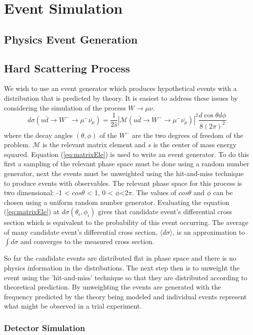 \chapter{Event Simulation}
\section{Physics Event Generation}
\section{Hard Scattering Process}
We wish to use an event generator which produces hypothetical events with a distribution
that is predicted by theory.
It is easiest to address these issues by considering the simulation of 
the process $W\rightarrow\mu\nu$. 
\begin{equation}
d\sigma(u\bar{d}\rightarrow W^{-}\rightarrow \mu^{-}\bar{\nu_{\mu}})
=\frac{1}{2\hat{s}}|\mathcal{M}(u\bar{d}\rightarrow W^{-}\rightarrow \mu^{-}\bar{\nu_{\mu}})|^{2}
\frac{d\cos\theta d\phi}{8(2\pi)^{2}}
\label{eq:matrixEle}
\end{equation}
where the decay angles $(\theta,\phi)$ of the $W^{-}$ are the two degrees of
freedom of the problem. $\mathcal{M}$ is the relevant matrix element and $\hat{s}$
is the center of mass energy squared.
Equation (\ref{eq:matrixEle}) is used to write an event generator. 
To do this first a sampling of the relevant phase
space must be done using a random number generator, next the events must
be unweighted using the hit-and-miss technique to produce events with observables. %
The relevant phase space for this process is two dimensional: -1 < $cos\theta$ < 1,
0 < $\phi$<2$\pi$. The values of $cos\theta$ and $\phi$ can be chosen using
a uniform random number generator. 
Evaluating the equation (\ref{eq:matrixEle}) at $d\sigma(\theta_{i},\phi_{i})$ gives
that candidate event's differential cross section which is equivalent to the 
probability of this event occurring. The average of many candidate event's differential
cross section, $\langle d\sigma\rangle$, is an approximation to $\int d\sigma$ and converges
to the measured cross section.

So far the candidate events are distributed flat in phase space and there is 
no physics information in the distributions.
The next step then is to unweight the event using the 'hit-and-miss' technique
so that they are distributed according to theoretical prediction. By unweighting
the events are generated with the frequency predicted by the theory 
being modeled and individual events represent what might be observed in a
trial experiment. 


\subsection{Detector Simulation}
